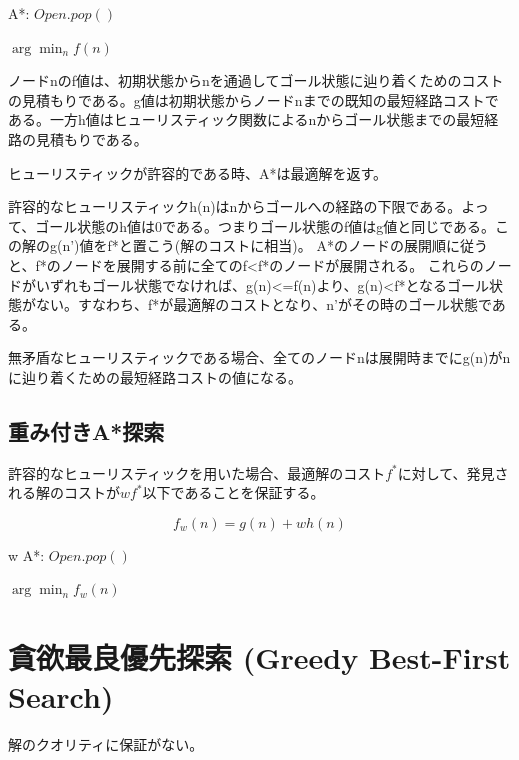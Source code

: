 \documentclass{report}
\begin{document}
\begin{algorithm}
\caption{A*: $Open.pop()$}
\label{alg:astar-open}
	\Return $\arg \min_n f(n)$
\end{algorithm}

ノードnのf値は、初期状態からnを通過してゴール状態に辿り着くためのコストの見積もりである。g値は初期状態からノードnまでの既知の最短経路コストである。一方h値はヒューリスティック関数によるnからゴール状態までの最短経路の見積もりである。

ヒューリスティックが許容的である時、A*は最適解を返す。

許容的なヒューリスティックh(n)はnからゴールへの経路の下限である。よって、ゴール状態のh値は0である。つまりゴール状態のf値はg値と同じである。この解のg(n')値をf*と置こう(解のコストに相当)。
A*のノードの展開順に従うと、f*のノードを展開する前に全てのf<f*のノードが展開される。
これらのノードがいずれもゴール状態でなければ、g(n)<=f(n)より、g(n)<f*となるゴール状態がない。すなわち、f*が最適解のコストとなり、n'がその時のゴール状態である。

無矛盾なヒューリスティックである場合、全てのノードnは展開時までにg(n)がnに辿り着くための最短経路コストの値になる。






\subsection{重み付きA*探索}
\label{sec:weighted-astar-search}

許容的なヒューリスティックを用いた場合、最適解のコスト$f^*$に対して、発見される解のコストが$w f^*$以下であることを保証する。

\begin{equation}
	f_w(n) = g(n) + w h(n)
\end{equation}

\begin{algorithm}
\caption{w A*: $Open.pop()$}
\label{alg:wastar-open}
	\Return $\arg \min_n f_w(n)$
\end{algorithm}

\section{貪欲最良優先探索 (Greedy Best-First Search)}
\label{sec:greedy-best-first-search}

解のクオリティに保証がない。
\end{document}
